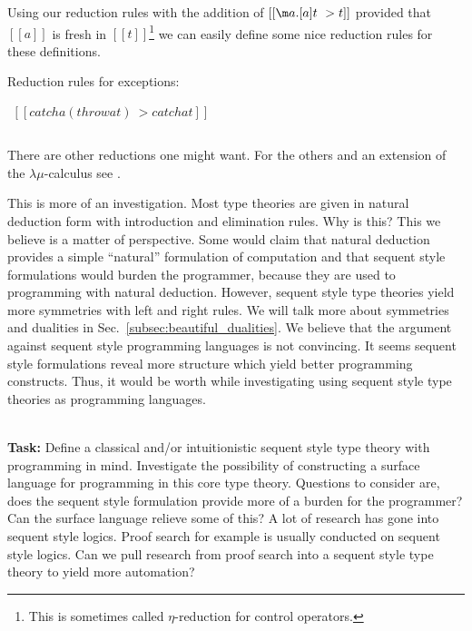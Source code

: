 Using our reduction rules with the addition of $[[\m a.[a]t ~> t]]$
provided that $[[a]]$ is fresh in $[[t]]$\footnote{This is sometimes called
$\eta$-reduction for control operators.} we can easily define some
nice reduction rules for these definitions. 
\begin{definition}
  \label{def:lamu_catch_throw_red}
  Reduction rules for exceptions:
  \begin{center}
    \begin{math}
      \begin{array}{lll}
        [[catch a (throw a t) ~> catch a t]]\\
        & \\
        [[throw a (catch b t) ~> throw a ([a /* b]t)]]
      \end{array}
    \end{math}
  \end{center}  
\end{definition}
\noindent
There are other reductions one might want.  For the others and an
extension of the $\lambda\mu$-calculus see \cite{Geuvers:2012}.

\begin{openproblem}
  This is more of an investigation.  Most type theories are given in
  natural deduction form with introduction and elimination rules.  Why
  is this?  This we believe is a matter of perspective.  Some would
  claim that natural deduction provides a simple ``natural''
  formulation of computation and that sequent style formulations would
  burden the programmer, because they are used to programming with
  natural deduction.  However, sequent style type theories yield
  more symmetries with left and right rules.  We will talk more about
  symmetries and dualities in Sec.~\ref{subsec:beautiful_dualities}.
  We believe that the argument against sequent style programming
  languages is not convincing.  It seems sequent style formulations
  reveal more structure which yield better programming constructs.
  Thus, it would be worth while investigating using sequent style type
  theories as programming languages.

  \ \\ \textbf{Task:} Define a classical and/or intuitionistic sequent
  style type theory with programming in mind.  Investigate the
  possibility of constructing a surface language for programming in
  this core type theory.  Questions to consider are, does the sequent
  style formulation provide more of a burden for the programmer?  Can
  the surface language relieve some of this?  A lot of research has
  gone into sequent style logics.  Proof search for example is usually
  conducted on sequent style logics.  Can we pull research from proof
  search into a sequent style type theory to yield more automation?
\end{openproblem}
